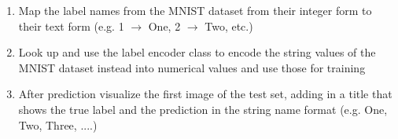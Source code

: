 \documentclass[USenglish,final,authoryear,12pt]{article}
\begin{document}
\begin{enumerate}
	\item Map the label names from the MNIST dataset from their integer form to their text form (e.g. 1 $\rightarrow$ One, 2 $\rightarrow$ Two, etc.)
	\item Look up and use the label encoder class to encode the string values of the MNIST dataset instead into numerical values and use those for training
	\item After prediction visualize the first image of the test set, adding in a title that shows the true label and the prediction in the string name format (e.g. One, Two, Three, ....)
\end{enumerate}
\end{document}
